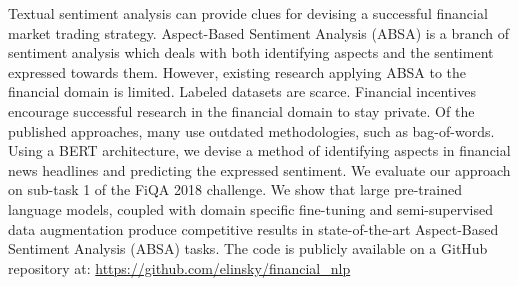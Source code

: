 Textual sentiment analysis can provide clues for devising a successful financial market trading strategy. Aspect-Based Sentiment Analysis (ABSA) is a branch of sentiment analysis which deals with both identifying aspects and the sentiment expressed towards them.
However, existing research applying ABSA to the financial domain is limited.
Labeled datasets are scarce.
Financial incentives encourage successful research in the financial domain to stay private.
Of the published approaches, many use outdated methodologies, such as bag-of-words.
Using a BERT architecture, we devise a method of identifying aspects in financial news headlines and predicting the expressed sentiment.
We evaluate our approach on sub-task 1 of the FiQA 2018 challenge.
We show that large pre-trained language models, coupled with domain specific fine-tuning and semi-supervised data augmentation produce competitive results in state-of-the-art Aspect-Based Sentiment Analysis (ABSA) tasks.
The code is publicly available on a GitHub repository at: \href{https://github.com/elinsky/financial_nlp}{https://github.com/elinsky/financial\_nlp}
